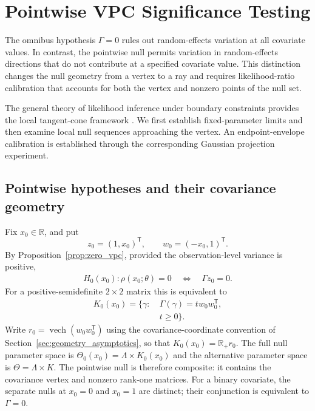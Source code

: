 
\section{Pointwise VPC Significance Testing}
\label{sec:pointwise_inference}


The omnibus hypothesis $\Gamma=0$ rules out
random-effects variation at all covariate values.
In contrast, the pointwise null permits variation
in random-effects directions that do not contribute
at a specified covariate value. This distinction
changes the null geometry from a vertex to a ray
and requires likelihood-ratio calibration that
accounts for both the vertex and nonzero points
of the null set.

The general theory of likelihood inference under
boundary constraints provides the local
tangent-cone framework
\citep{self1987asymptotic,shapiro1985}.
We first establish fixed-parameter limits and
then examine local null sequences approaching
the vertex. An endpoint-envelope calibration is established
through the corresponding Gaussian projection
experiment.

\subsection{Pointwise hypotheses and their covariance geometry}
\label{subsec:pointwise_null}

Fix $x_0\in\mathbb R$, and put
\[
z_0=(1,x_0)^{\mathsf T},\qquad
w_0=(-x_0,1)^{\mathsf T}.
\]
By Proposition~\ref{prop:zero_vpc}, provided the
observation-level variance is positive,
\begin{equation}\label{eq:sec6-pointwise-null}
\begin{aligned}
H_0(x_0):\rho(x_0;\theta)=0
\quad\Longleftrightarrow\quad
\Gamma z_0=0.
\end{aligned}
\end{equation}
For a positive-semidefinite $2\times2$ matrix this is
equivalent to
\begin{equation}\label{eq:sec6-null-ray}
\begin{aligned}
K_0(x_0)=\bigl\{\gamma:\ &
\Gamma(\gamma)=t w_0w_0^{\mathsf T},\\
& t\geq0\bigr\}.
\end{aligned}
\end{equation}
Write $r_0=\operatorname{vech}(w_0w_0^{\mathsf T})$
using the covariance-coordinate convention of
Section~\ref{sec:geometry_asymptotics},
so that $K_0(x_0)=\mathbb R_+r_0$. The full null parameter
space is $\Theta_0(x_0)=\Lambda\times K_0(x_0)$ and the
alternative parameter space is $\Theta=\Lambda\times K$.
The pointwise null is therefore composite: it contains
the covariance vertex and nonzero rank-one matrices.
For a binary covariate, the separate nulls at $x_0=0$
and $x_0=1$ are distinct; their conjunction is equivalent
to $\Gamma=0$.

